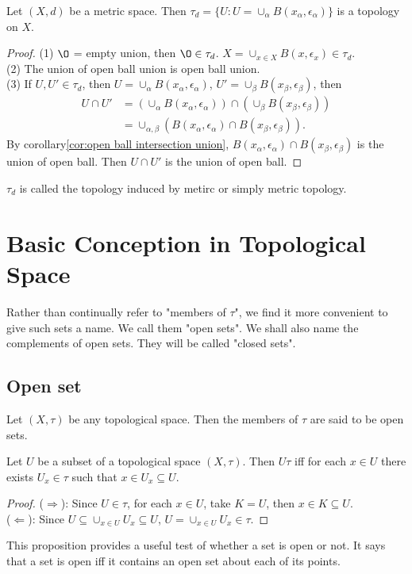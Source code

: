 \begin{proposition}{}{}
    Let $(X,d)$ be a metric space. Then $\tau_d=\{U: U=\cup_{\alpha} B(x_{\alpha}, \epsilon_{\alpha}) \}$ is a topology on $X$. 
\end{proposition}
\begin{proof}
    (1) $\O$ = empty union, then $\O\in \tau_d$. $X=\cup_{x\in X}B(x,\epsilon_{x})\in \tau_d$.\\
    (2) The union of open ball union is open ball union.\\
    (3) If $U,U'\in \tau_d$, then $U=\cup_{\alpha} B(x_{\alpha}, \epsilon_{\alpha})$, $U'=\cup_{\beta} B(x_{\beta}, \epsilon_{\beta})$, then
    \begin{align*}
        U\cap U' &= (\cup_{\alpha} B(x_{\alpha}, \epsilon_{\alpha}))\cap(\cup_{\beta} B(x_{\beta}, \epsilon_{\beta}))\\
                &= \cup_{\alpha,\beta} (B(x_{\alpha}, \epsilon_{\alpha})\cap B(x_{\beta}, \epsilon_{\beta})).
    \end{align*}
    By corollary\ref{cor:open ball intersection union}, $B(x_{\alpha}, \epsilon_{\alpha})\cap B(x_{\beta}, \epsilon_{\beta})$ is the union of open ball. 
    Then $U\cap U'$ is the union of open ball.
\end{proof}

$\tau_d$ is called the topology induced by metirc or simply metric topology. 

\section{Basic Conception in Topological Space}

Rather than continually refer to "members of $\tau$", we find it more convenient to give such sets a name. 
We call them "open sets". We shall also name the complements of open sets. They will be called "closed sets". 

\subsection{Open set}
\begin{definition}{}{}
    Let $(X,\tau)$ be any topological space. Then the members of $\tau$ are said to be open sets.
\end{definition}

\begin{proposition}{}{}
    Let $U$ be a subset of a topological space $(X,\tau)$.
    Then $U\tau$ iff for each $x\in U$ there exists $U_x\in\tau$ such that $x\in U_x\subseteq U$.
\end{proposition}
\begin{proof}
    ($\Rightarrow$): Since $U\in\tau$, for each $x\in U$, take $K=U$, then $x\in K\subseteq U$.\\
    ($\Leftarrow$): Since $U\subseteq \cup_{x\in U}U_x\subseteq U$, $U=\cup_{x\in U}U_x\in\tau$. 
\end{proof}
\begin{remark}
    This proposition provides a useful test of whether a set is open or not. 
    It says that a set is open iff it contains an open set about each of its points.
\end{remark}


